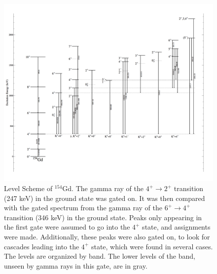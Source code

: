 \begin{figure}[!]
    \centering
    \includegraphics[scale=0.18]{154GdTablesAndFigs/154Gd_4to2.png}
    \caption{Level Scheme of $^{154}$Gd. The gamma ray of the $4^+\rightarrow2^+$ transition (247 keV) in the ground state was gated on. It was then compared with the gated spectrum from the gamma ray of the $6^+\rightarrow4^+$ transition (346 keV) in the ground state. Peaks only appearing in the first gate were assumed to go into the $4^+$ state, and assignments were made. Additionally, these peaks were also gated on, to look for cascades leading into the $4^+$ state, which were found in several cases. The levels are organized by band. The lower levels of the band, unseen by gamma rays in this gate, are in gray.}
    \label{fig:154_4to2}
\end{figure}